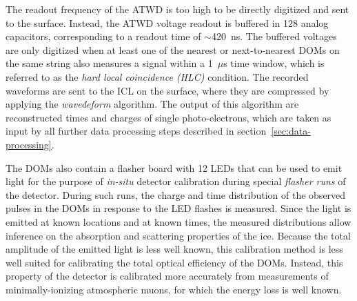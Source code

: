 The readout frequency of the ATWD is too high to be directly digitized and sent to the surface.
Instead, the ATWD voltage readout is buffered in 128 analog capacitors, corresponding to a readout time of $\sim$420~ns.
The buffered voltages are only digitized when at least one of the nearest or next-to-nearest DOMs on the same string also measures a signal within a 1~$\mu$s time window, which is referred to as the \emph{hard local coincidence (HLC)} condition.
The recorded waveforms are sent to the ICL on the surface, where they are compressed by applying the \emph{wavedeform} algorithm.
The output of this algorithm are reconstructed times and charges of single photo-electrons, which are taken as input by all further data processing steps described in section~\ref{sec:data-processing}.

The DOMs also contain a flasher board with 12 LEDs that can be used to emit light for the purpose of \emph{in-situ} detector calibration during special \emph{flasher runs} of the detector.
During such runs, the charge and time distribution of the observed pulses in the DOMs in response to the LED flashes is measured.
Since the light is emitted at known locations and at known times, the measured distributions allow inference on the absorption and scattering properties of the ice.
Because the total amplitude of the emitted light is less well known, this calibration method is less well suited for calibrating the total optical efficiency of the DOMs.
Instead, this property of the detector is calibrated more accurately from measurements of minimally-ionizing atmospheric muons, for which the energy loss is well known.
